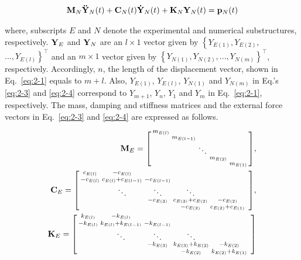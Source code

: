 \begin{equation}\label{eq:2-4}
\mathbf{M}_{N}\mathbf{\ddot{Y}}_{N}(t)+\mathbf{C}_{N}(t)\mathbf{\dot{Y}}_{N}(t)+\mathbf{K}_{N}\mathbf{Y}_{N}(t) = \mathbf{p}_{N}(t)
\end{equation}

where, subscripts $E$ and $N$ denote the experimental and numerical substructures, respectively. $\mathbf{Y}_{E}$ and $\mathbf{Y}_{N}$ are an $l \times 1$ vector given by $\left\{Y_{E(1)},Y_{E(2)},\right.$ $\left....,Y_{E(l)}\right\}^{\top}$ and an $m \times 1$ vector given by $\left\{Y_{N(1)},Y_{N(2)},...,Y_{N(m)}\right\}^{\top}$, respectively. Accordingly, $n$, the length of the displacement vector, shown in Eq.~\eqref{eq:2-1} equals to $m+l$. Also, $Y_{E(1)}$, $Y_{E(l)}$, $Y_{N(1)}$ and $Y_{N(m)}$ in Eq.'s \eqref{eq:2-3} and \eqref{eq:2-4} correspond to $Y_{m+1}$, $Y_{n}$, $Y_{1}$ and $Y_{m}$ in Eq.~\eqref{eq:2-1}, respectively. The mass, damping and stiffness matrices and the external force vectors in Eq.~\eqref{eq:2-3} and \eqref{eq:2-4} are expressed as follows.

\begin{equation}\label{eq:2-5}
\begin{aligned}
\mathbf{M}_{E} = \begin{bsmallmatrix} m_{E(l)}&&&&\\&m_{E(l-1)}&&&\\&&\ddots&&\\&&&m_{E(2)}&\\&&&&m_{E(1)} \end{bsmallmatrix},\\
\mathbf{C}_{E} = \begin{bsmallmatrix} c_{E(l)}&-c_{E(l)}&&&&\\-c_{E(l)}&c_{E(l)}+c_{E(l-1)}&-c_{E(l-1)}&&\\&\ddots&\ddots&\ddots&\\&&-c_{E(3)}&c_{E(3)}+c_{E(2)}&-c_{E(2)}\\&&&-c_{E(2)}&c_{E(2)}+c_{E(1)} \end{bsmallmatrix},\\
\mathbf{K}_{E} = \begin{bsmallmatrix} k_{E(l)}&-k_{E(l)}&&&&\\-k_{E(l)}&k_{E(l)}+k_{E(l-1)}&-k_{E(l-1)}&&\\&\ddots&\ddots&\ddots&\\&&-k_{E(3)}&k_{E(3)}+k_{E(2)}&-k_{E(2)}\\&&&-k_{E(2)}&k_{E(2)}+k_{E(1)} \end{bsmallmatrix}
\end{aligned}
\end{equation}

